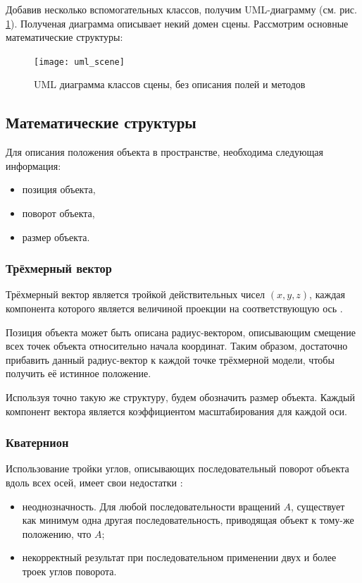 Добавив несколько вспомогательных классов, получим UML-диаграмму (см. рис. \ref{fig:uml_scene}). Полученая диаграмма описывает некий домен сцены. Рассмотрим основные математические структуры:
\begin{figure}[ht]
	\centering
	\texttt{[image: uml\_scene]}
	\caption{UML диаграмма классов сцены, без описания полей и методов}
	\label{fig:uml_scene}
\end{figure}

\subsection{Математические структуры}
Для описания положения объекта в пространстве, необходима следующая информация:
\begin{itemize}
	\item позиция объекта,
	\item поворот объекта,
	\item размер объекта.
\end{itemize}

\subsubsection{Трёхмерный вектор}
Трёхмерный вектор является тройкой действительных чисел $(x, y, z)$, каждая компонента которого является величиной проекции на соответствующую ось \cite{bib:vector}.

Позиция объекта может быть описана радиус-вектором, описывающим смещение всех точек объекта относительно начала координат. Таким образом, достаточно прибавить данный радиус-вектор к каждой точке трёхмерной модели, чтобы получить её истинное положение.

Используя точно такую же структуру, будем обозначить размер объекта. Каждый компонент вектора является коэффициентом масштабирования для каждой оси.
	
\subsubsection{Кватернион}
Использование тройки углов, описывающих последовательный поворот объекта вдоль всех осей, имеет свои недостатки \cite{bib:euler_problems}:
\begin{itemize}
	\item неоднозначность. Для любой последовательности вращений $A$, существует как минимум одна другая последовательность, приводящая объект к тому-же положению, что $A$;
	\item некорректный результат при последовательном применении двух и более троек углов поворота.
\end{itemize}

